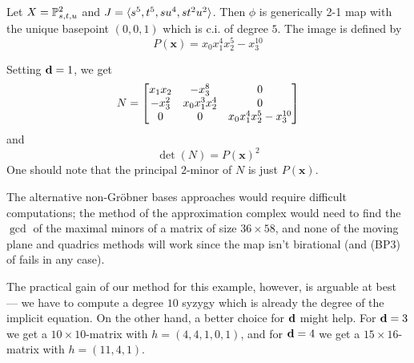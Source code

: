 \documentclass[fleqn,reqno]{amsart}
\numberwithin{first}{chapter}
\begin{document}
\begin{example}[$\mt{ex308}$]
\label{ex308}
Let $X=\mathbb{P}^2_{s,t,u}$ and $J=\langle s^5,t^5,su^4,st^2u^2\rangle$.
Then $\phi$ is generically 2-1 map with the unique basepoint $(0,0,1)$
which is c.i. of degree $5$.
The image is defined by
\[
	P(\mathbf x)={x}_{0} {x}_{1}^{4} {x}_{2}^{5}-{x}_{3}^{10}
\]

Setting $\mathbf d=1$, we get
\[
	N=
	\bgroup\begin{bmatrix}{x}_{1} {x}_{2}&
      {-{x}_{3}^{8}}&
      0\\
      {-{x}_{3}^{2}}&
      {x}_{0} {x}_{1}^{3} {x}_{2}^{4}&
      0\\
      0&
      0&
      {x}_{0} {x}_{1}^{4} {x}_{2}^{5}-{x}_{3}^{10}\\
      \end{bmatrix}\egroup
\]
and
\[
	\det(N)=P(\mathbf x)^2
\]
One should note that the principal $2$-minor of $N$ is just $P(\mathbf x)$.

The alternative non-Gr\"obner bases approaches would require difficult computations;
the method of the approximation complex would need to find the $\gcd$ of the maximal
minors of a matrix of size $36\times58$, and none of the moving plane and quadrics
methods will work since the map isn't birational
(and (BP3) of \citet{BCD-03} fails in any case).

The practical gain of our method for this example, however, is arguable at best ---
we have to compute a degree $10$ syzygy which is already the degree of the implicit equation.
On the other hand, a better choice for $\mathbf d$ might help.
For $\mathbf d=3$ we get a $10\times10$-matrix with $h=(4,4,1,0,1)$,
and for $\mathbf d=4$ we get a $15\times16$-matrix with $h=(11,4,1)$.
\end{example}
\end{document}
